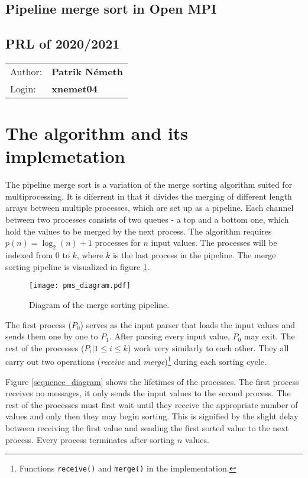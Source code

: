 \documentclass[pdftex, 11pt, a4paper, titlepage]{article}
\begin{document}
    \begin{center}
        \section*{Pipeline merge sort in Open MPI}
        \subsection*{PRL of 2020/2021}
        \begin{tabular}{ l l }
            Author: & \textbf{Patrik Németh} \\
            Login: & \textbf{xnemet04}
        \end{tabular}
    \end{center}
    \section{The algorithm and its implemetation}
        The pipeline merge sort is a variation of the merge sorting algorithm suited for multiprocessing.
        It is diferrent in that it divides the merging of different length arrays between multiple processes,
        which are set up as a pipeline. Each channel between two processes consists of two queues - a top and a bottom
        one, which hold the values to be merged by the next process. The algorithm requires $p(n) = \log_{2}(n)+1$ processes
        for $n$ input values. The processes will be indexed from $0$ to $k$, where $k$ is the last process in the pipeline.
        The merge sorting pipeline is visualized in figure \ref{pms_diagram}.

        \begin{figure}[h]
            \centering
            \texttt{[image: pms\_diagram.pdf]}
            \caption{Diagram of the merge sorting pipeline.}
            \label{pms_diagram}
        \end{figure}

        The first process ($P_0$) serves as the input parser that loads the input values and sends them one by
        one to $P_1$. After parsing every input value, $P_0$ may exit. The rest of the processes
        ($P_i | 1\leq{}i\leq{}k$) work very similarly to each other. They all carry out two operations (\emph{receive}
        and \emph{merge})\footnote{Functions \texttt{receive()} and \texttt{merge()} in the implementation.} during each
        sorting cycle.

        Figure \ref{sequence_diagram} shows the lifetimes of the processes. The first process receives no messages,
        it only sends the input values to the second process. The rest of the processes must first wait until they
        receive the appropriate number of values and only then they may begin sorting. This is signified by the slight delay
        between receiving the first value and sending the first sorted value to the next process. Every process terminates
        after sorting $n$ values.
\end{document}
